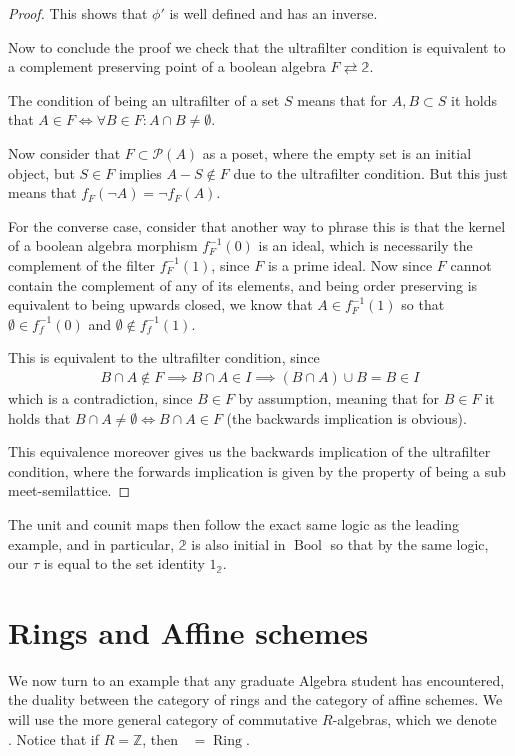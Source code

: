 \documentclass[12pt,a4paper]{article}
\DeclareMathOperator{\Bool}{Bool}
\DeclareMathOperator{\CAlg}{CAlg_R}
\DeclareMathOperator{\CAlgZ}{CAlg_\mathbb{Z}}
\DeclareMathOperator{\Ring}{Ring}
\begin{document}
\begin{proof}
This shows that $\phi'$ is well defined and has an inverse. 

Now to conclude the proof we check that the ultrafilter condition is equivalent to a complement preserving point of a boolean algebra $F \rightleftarrows \mathbb{2}$.

The condition of being an ultrafilter of a set $S$ means that for $A, B \subset S$ it holds that $A \in F \iff \forall B \in F: A \cap B \neq \emptyset $.


 Now consider that $F \subset \mathcal{P}(A)$ as a poset, where the empty set is an initial object, but $S \in F$ implies $A - S \notin F$ due to the ultrafilter condition. But this just means that $f_F(\neg A) = \neg f_F(A)$. 
 
 For the converse case, consider that another way to phrase this is that the kernel of a boolean algebra morphism $f_F^{-1}(0)$ is an ideal, which is necessarily the complement of the filter $f_F^{-1}(1)$, since $F$ is a prime ideal. Now since $F$ cannot contain the complement of any of its elements, and being order preserving is equivalent to being upwards closed, we know that $A \in f_F^{-1}(1)$ so that $\emptyset \in f_f^{-1}(0)$ and $\emptyset \notin f_f^{-1}(1)$.
 
This is equivalent to the ultrafilter condition, since \begin{align*}
 	B \cap A \notin F \implies B \cap A \in I \implies (B \cap A) \cup B = B \in I
 \end{align*}
 which is a contradiction, since $B \in F$ by assumption, meaning that for $B \in F$ it holds that  $B \cap A \neq \emptyset \iff B \cap A \in F$ (the backwards implication is obvious). 
 
 This equivalence moreover gives us the backwards implication of the ultrafilter condition, where the forwards implication is given by the property of being a sub meet-semilattice.
\end{proof}


The unit and counit maps then follow the exact same logic as the leading example, and in particular, $\mathbb{2}$ is also initial in $\Bool$ so that by the same logic, our $\tau$ is equal to the set identity $1_{\mathbb{2}}$. 



\section{Rings and Affine schemes}

We now turn to an example that any graduate Algebra student has encountered, the duality between the category of rings and the category of affine schemes. We will use the more general category of commutative $R$-algebras, which we denote $\CAlg$. Notice that if $R = \mathbb{Z}$, then $\CAlgZ = \Ring$. 
\end{document}
